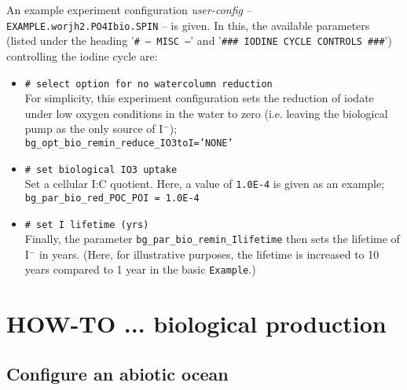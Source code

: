 \documentclass[11pt,fleqn]{book} %
\begin{document}
An example experiment configuration \textit{user-config} -- \texttt{EXAMPLE.worjh2.PO4Ibio.SPIN} -- is given. In this, the available parameters (listed under the heading '\texttt{\# --- MISC ---}' and '\texttt{\#\#\# IODINE CYCLE CONTROLS \#\#\#}') controlling the iodine cycle are:

\begin{itemize}[noitemsep]

\vspace{1mm}
        \item \texttt{\# select option for no watercolumn reduction}
        \\ For simplicity, this experiment configuration sets the reduction of iodate under low oxygen conditions in the water to zero (i.e. leaving the biological pump as the only source of I\(^{-}\));
\\ \texttt{bg\_opt\_bio\_remin\_reduce\_IO3toI='NONE'}

\vspace{1mm}
        \item \texttt{\# set biological IO3 uptake}
        \\ Set a cellular I:C quotient. Here, a value of \texttt{1.0E-4} is given as an example;
\\ \texttt{bg\_par\_bio\_red\_POC\_POI = 1.0E-4}

\vspace{1mm}
        \item \texttt{\# set I lifetime (yrs)}
        \\ Finally, the parameter \texttt{bg\_par\_bio\_remin\_Ilifetime} then sets the lifetime of I\(^{-}\) in years. (Here, for illustrative purposes, the lifetime is increased to 10 years compared to 1 year in the basic \texttt{Example}.)

\end{itemize}
\vspace{1mm}


\newpage


\section{HOW-TO ...  biological production}

%
\subsection*{Configure an abiotic ocean}
\vspace{1mm}
\end{document}
